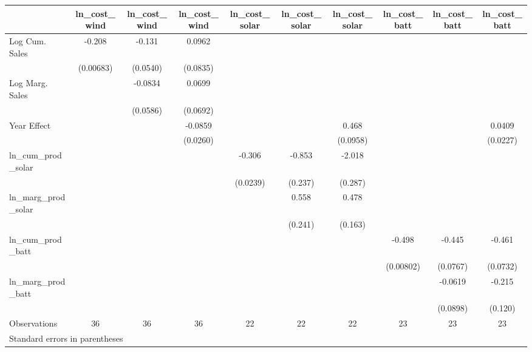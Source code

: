 \begin{tabular}{l*{9}{c}}
\hline\hline
                    &\multicolumn{1}{c}{ln\_cost\_wind}&\multicolumn{1}{c}{ln\_cost\_wind}&\multicolumn{1}{c}{ln\_cost\_wind}&\multicolumn{1}{c}{ln\_cost\_solar}&\multicolumn{1}{c}{ln\_cost\_solar}&\multicolumn{1}{c}{ln\_cost\_solar}&\multicolumn{1}{c}{ln\_cost\_batt}&\multicolumn{1}{c}{ln\_cost\_batt}&\multicolumn{1}{c}{ln\_cost\_batt}\\
\hline
Log Cum. Sales      &      -0.208&      -0.131&      0.0962&            &            &            &            &            &            \\
                    &   (0.00683)&    (0.0540)&    (0.0835)&            &            &            &            &            &            \\
Log Marg. Sales     &            &     -0.0834&      0.0699&            &            &            &            &            &            \\
                    &            &    (0.0586)&    (0.0692)&            &            &            &            &            &            \\
Year Effect         &            &            &     -0.0859&            &            &       0.468&            &            &      0.0409\\
                    &            &            &    (0.0260)&            &            &    (0.0958)&            &            &    (0.0227)\\
ln\_cum\_prod\_solar   &            &            &            &      -0.306&      -0.853&      -2.018&            &            &            \\
                    &            &            &            &    (0.0239)&     (0.237)&     (0.287)&            &            &            \\
ln\_marg\_prod\_solar  &            &            &            &            &       0.558&       0.478&            &            &            \\
                    &            &            &            &            &     (0.241)&     (0.163)&            &            &            \\
ln\_cum\_prod\_batt    &            &            &            &            &            &            &      -0.498&      -0.445&      -0.461\\
                    &            &            &            &            &            &            &   (0.00802)&    (0.0767)&    (0.0732)\\
ln\_marg\_prod\_batt   &            &            &            &            &            &            &            &     -0.0619&      -0.215\\
                    &            &            &            &            &            &            &            &    (0.0898)&     (0.120)\\
\hline
Observations        &          36&          36&          36&          22&          22&          22&          23&          23&          23\\
\hline\hline
\multicolumn{10}{l}{\footnotesize Standard errors in parentheses}\\
\end{tabular}

